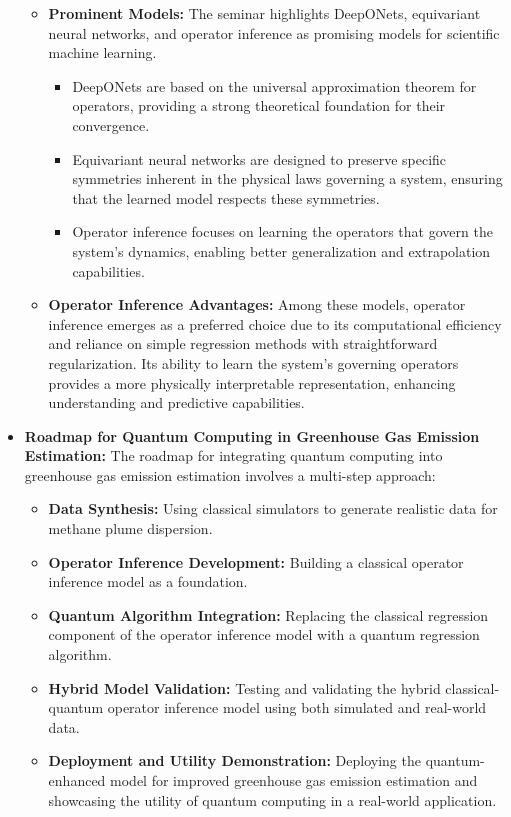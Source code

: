 \documentclass[
]{article}
\begin{document}
\begin{itemize}
  \begin{itemize}
  
  \item
    \textbf{Prominent Models:} The seminar highlights DeepONets,
    equivariant neural networks, and operator inference as promising
    models for scientific machine learning.

    \begin{itemize}
    
    \item
      DeepONets are based on the universal approximation theorem for
      operators, providing a strong theoretical foundation for their
      convergence.
    \item
      Equivariant neural networks are designed to preserve specific
      symmetries inherent in the physical laws governing a system,
      ensuring that the learned model respects these symmetries.
    \item
      Operator inference focuses on learning the operators that govern
      the system's dynamics, enabling better generalization and
      extrapolation capabilities.
    \end{itemize}
  \item
    \textbf{Operator Inference Advantages:} Among these models, operator
    inference emerges as a preferred choice due to its computational
    efficiency and reliance on simple regression methods with
    straightforward regularization. Its ability to learn the system's
    governing operators provides a more physically interpretable
    representation, enhancing understanding and predictive capabilities.
  \end{itemize}
\item
  \textbf{Roadmap for Quantum Computing in Greenhouse Gas Emission
  Estimation:} The roadmap for integrating quantum computing into
  greenhouse gas emission estimation involves a multi-step approach:

  \begin{itemize}
  
  \item
    \textbf{Data Synthesis:} Using classical simulators to generate
    realistic data for methane plume dispersion.
  \item
    \textbf{Operator Inference Development:} Building a classical
    operator inference model as a foundation.
  \item
    \textbf{Quantum Algorithm Integration:} Replacing the classical
    regression component of the operator inference model with a quantum
    regression algorithm.
  \item
    \textbf{Hybrid Model Validation:} Testing and validating the hybrid
    classical-quantum operator inference model using both simulated and
    real-world data.
  \item
    \textbf{Deployment and Utility Demonstration:} Deploying the
    quantum-enhanced model for improved greenhouse gas emission
    estimation and showcasing the utility of quantum computing in a
    real-world application.
  \end{itemize}


\end{itemize}
\end{document}
